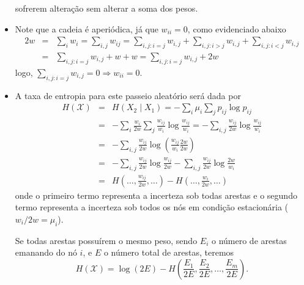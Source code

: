 \begin{frame}[allowframebreaks]
\begin{itemize}
	sofrerem alteração sem alterar a soma dos pesos.
  \item Note que a cadeia é aperiódica, já que $w_{ii} = 0$, como evidenciado abaixo
	\begin{eqnarray}
	2w &=& \sum_i w_i = \sum_{i,j} w_{ij} = \sum_{i,j : i=j} w_{i,j} + \sum_{i,j : i>j} w_{i,j} + \sum_{i,j : i<j} w_{i,j}  \nonumber \\
	&=& \sum_{i,j : i=j} w_{i,j} + w + w = \sum_{i,j : i=j} w_{i,j} + 2w
	\end{eqnarray}
 	logo, $\sum_{i,j : i=j} w_{i,j} = 0 \Rightarrow w_{ii} = 0$.
  \item A taxa de entropia para este passeio aleatório será dada por
	\begin{eqnarray}
	H(\mathcal{X}) &=& H(X_2 \mid X_1) = -\sum_i \mu_i \sum_j p_{ij} \log p_{ij} \nonumber \\
		&=& - \sum_i \frac{w_i}{2w} \sum_j \frac{w_{ij}}{w_i} \log \frac{w_{ij}}{w_i} = - \sum_{i,j} \frac{w_{ij}}{2w} \log \frac{w_{ij}}{w_i} \nonumber \\
		&=& - \sum_{i,j} \frac{w_{ij}}{2w} \log \left( \frac{w_{ij}}{w_i} \frac{2w}{2w} \right) \nonumber \\
		&=& - \sum_{i,j} \frac{w_{ij}}{2w} \log \frac{w_{ij}}{2w} - \sum_{i,j} \frac{w_{ij}}{2w} \log \frac{2w}{w_i} \nonumber \\
		&=& H\left( \ldots,\frac{w_{ij}}{2w} , \ldots \right) - H\left( \ldots,\frac{w_{i}}{2w} , \ldots \right) 
	\end{eqnarray}
	onde o primeiro termo representa a incerteza sob todas arestas e o segundo termo representa a incerteza sob todos os nós em condição estacionária
	($w_i/2w=\mu_i$).

	Se todas arestas possuírem o mesmo peso, sendo $E_i$ o número de arestas emanando do nó $i$, e $E$
	o número total de arestas, teremos
	\begin{equation}
	H(\mathcal{X}) = \log (2E) - H \left( \frac{E_1}{2E}, \frac{E_2}{2E}, \ldots, \frac{E_m}{2E} \right) .
	\end{equation}
  \end{itemize}
\end{frame}


